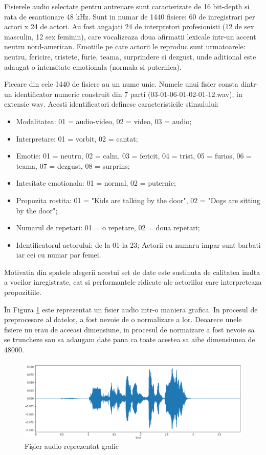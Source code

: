 \documentclass[a4paper, 12pt]{report}
\begin{document}
	Fisierele audio selectate pentru antrenare sunt caracterizate de 16 bit-depth si rata de esantionare 48 kHz. Sunt in numar de 1440 fisiere: 60 de inregistrari per actori x 24 de actori. Au fost angajati 24 de interpretori profesionisti (12 de sex masculin, 12 sex feminin), care vocalizeaza doua afirmatii lexicale intr-un accent neutru nord-american. Emotiile pe care actorii le reproduc sunt urmatoarele: neutru, fericire, tristete, furie, teama, surprindere si dezgust, unde aditional este adaugat o intensitate emotionala (normala si puternica).
	
	Fiecare din cele 1440 de fisiere au un nume unic. Numele unui fisier consta dintr-un identificator numeric construit din 7 parti (03-01-06-01-02-01-12.wav), in extensie wav. Acesti identificatori definesc caracteristicile stimulului:
	
	\begin{itemize}
		\item Modalitatea: 01 = audio-video, 02 = video, 03 = audio;
		\item Interpretare: 01 = vorbit, 02 = cantat;
		\item Emotie: 01 = neutru, 02 = calm, 03 = fericit, 04 = trist, 05 = furios, 06 = teama, 07 = dezgust, 08 = surprins;
		\item Intesitate emotionala: 01 = normal, 02 = puternic;
		\item Propozita rostita: 01 = "Kids are talking by the door", 02 = "Dogs are sitting by the door";
		\item Numarul de repetari: 01 = o repetare, 02 = doua repetari;
		\item Identificatorul actorului: de la 01 la 23; Actorii cu numaru impar sunt barbati iar cei cu numar par femei.
	\end{itemize}

	Motivatia din spatele alegerii acestui set de date este sustinuta de calitatea inalta a vocilor inregistrate, cat si performantele ridicate ale actoriilor care interpreteaza propozitiile.
	
	În Figura \ref{fig:audio_plot} este reprezentat un fisier audio intr-o maniera grafica. In procesul de preprocesare al datelor, a fost nevoie de o normalizare a lor. Deoarece unele fisiere nu erau de aceeasi dimensiune, in procesul de normaizare a fost nevoie sa se truncheze sau sa adaugam date pana ca toate acestea sa aibe dimensiunea de 48000.
	
	\begin{figure}[H]
		\begin{center}
			\includegraphics[scale=0.6]{images/audio_plot.png}
		\end{center}
		\caption{Fișier audio reprezentat grafic}
		\label{fig:audio_plot}
	\end{figure}
	
\end{document}

